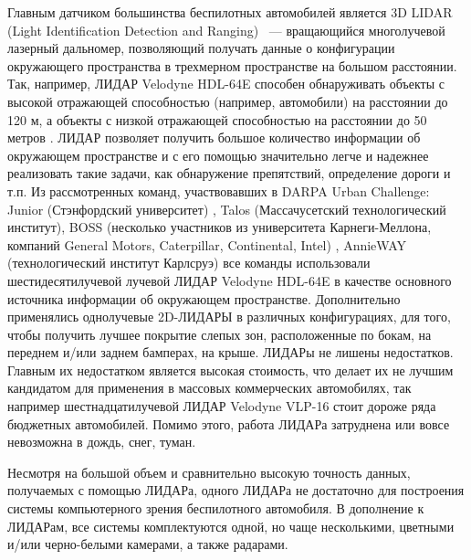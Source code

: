 Главным датчиком большинства беспилотных автомобилей является 3D LIDAR (Light Identification Detection and
Ranging) ~--- вращающийся многолучевой лазерный дальномер, позволяющий получать данные о конфигурации окружающего
пространства в трехмерном пространстве на большом расстоянии. Так, например, ЛИДАР Velodyne HDL-64E способен
обнаруживать объекты с высокой отражающей способностью (например, автомобили) на расстоянии до 120 м, а объекты
с низкой отражающей способностью на расстоянии до 50 метров \cite{sensor_hdl64_manual}.  ЛИДАР позволяет получить большое
количество информации об окружающем пространстве и с его помощью значительно легче и надежнее реализовать такие задачи,
как обнаружение препятствий, определение дороги и т.п.  Из рассмотренных команд, участвовавших в DARPA Urban Challenge:
Junior (Стэнфордский университет) \cite{darpa_junior}, Talos (Массачусетский технологический институт)\cite{darpa_mit},
BOSS (несколько участников из университета Карнеги-Меллона, компаний General Motors,  Caterpillar, Continental, Intel)
\cite{darpa_boss}, AnnieWAY (технологический институт Карлсруэ) \cite{darpa_annieway} все команды использовали
шестидесятилучевой лучевой ЛИДАР Velodyne HDL-64E в качестве основного источника информации об окружающем пространстве.
Дополнительно применялись однолучевые 2D-ЛИДАРЫ в различных конфигурациях, для того, чтобы получить лучшее
покрытие слепых зон, расположенные по бокам, на переднем и/или заднем бамперах, на крыше. ЛИДАРы не лишены
недостатков. Главным их недостатком является высокая стоимость, что делает их не лучшим кандидатом для применения
в массовых коммерческих автомобилях, так например шестнадцатилучевой ЛИДАР Velodyne VLP-16 стоит дороже ряда
бюджетных автомобилей. Помимо этого, работа ЛИДАРа затруднена или вовсе невозможна в  дождь, снег,
туман.

Несмотря на большой объем и сравнительно высокую точность данных, получаемых с помощью ЛИДАРа, одного ЛИДАРа не
достаточно для построения системы компьютерного зрения беспилотного автомобиля. В дополнение к ЛИДАРам, все
системы комплектуются одной, но чаще несколькими, цветными и/или черно-белыми камерами, а также радарами.

